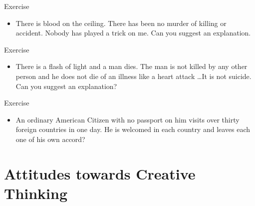 \documentclass[notes]{beamer}
\begin{document}
\begin{frame}{Exercise}
	\begin{itemize}
		\item There is blood on the ceiling. There has been no murder of killing or accident. Nobody has played a trick on me. Can you suggest an explanation. 
	\end{itemize}

\end{frame}

\begin{frame}{Exercise}
	\begin{itemize}
		\item There is a flash of light and a man dies. The man is not killed by any other person and he does not die of an illness like a heart attack \dots It is not suicide. Can you suggest an explanation?
	\end{itemize}
	
\end{frame} 

\begin{frame}{Exercise}
	\begin{itemize}
		\item An ordinary American Citizen with no passport on him visits over thirty foreign countries in one day. He is welcomed in each country and leaves each one of his own accord?
	\end{itemize}
	
\end{frame}

\section{Attitudes towards Creative Thinking}

\end{document}
